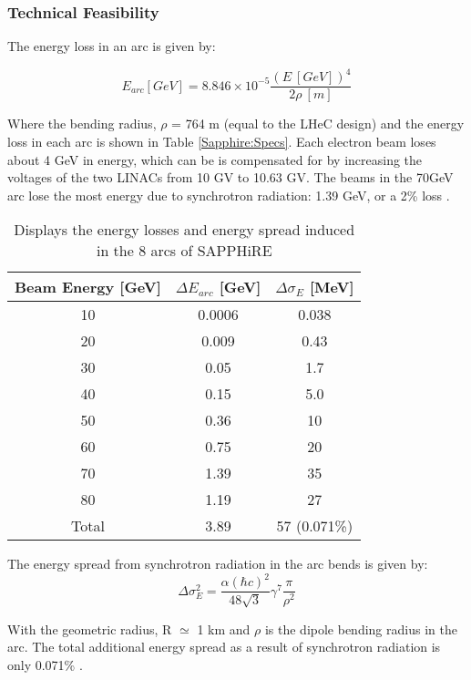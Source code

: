 \subsubsection{Technical Feasibility}
The energy loss in an arc is given by:

\begin{equation}
E_{arc}[GeV]=8.846 \times 10^{-5}\frac{(E \ [GeV])^{4}}{2\rho \ [m]}
\end{equation}

Where the bending radius, $\rho$ = 764 m (equal to the LHeC design) and the energy loss in each arc is shown in Table \ref{Sapphire:Specs}. Each electron beam loses about 4 GeV in energy, which can be is compensated for by increasing the voltages of the two LINACs from 10 GV to 10.63 GV. The beams in the 70GeV arc lose the most energy due to synchrotron radiation: 1.39 GeV, or a 2\% loss \cite{Bogacz:SAPPHiRE}.

\begin{table}[!htb]
\begin{center}
\begin{tabular}{c c c}
\hline
\hline
Beam Energy [GeV] & $\Delta E_{arc}$ [GeV] & $\Delta\sigma_{E}$ [MeV]\\
\hline
10 & 0.0006 & 0.038\\
20 & 0.009 & 0.43\\
30 & 0.05 & 1.7\\
40 & 0.15 & 5.0\\
50 & 0.36 & 10\\
60 & 0.75 & 20\\
70 & 1.39 & 35\\
80 & 1.19 & 27\\
\hline
Total & 3.89 & 57 (0.071\%)\\
\hline
\hline
\end{tabular}
\caption{Displays the energy losses and energy spread induced in the 8 arcs of SAPPHiRE}
\end{center}
\end{table}

The energy spread from synchrotron radiation in the arc bends is given by:
\begin{equation}
\Delta\sigma^{2}_{E}=\frac{\alpha(\hbar c)^{2}}{48\sqrt{3}}\gamma^{7}\frac{\pi}{\rho^{2}}
\end{equation}

With the geometric radius, R $\simeq$ 1 km and $\rho$ is the dipole bending radius in the arc. The total additional energy spread as a result of synchrotron radiation is only 0.071\% \cite{Bogacz:SAPPHiRE}.

